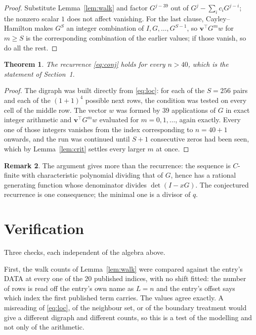 \documentclass[11pt,a4paper]{article}
\theoremstyle{plain}
\newtheorem{theorem}{Theorem}
\theoremstyle{definition}
\newtheorem{remark}[theorem]{Remark}
\begin{document}
\begin{proof}
Substitute Lemma~\ref{lem:walk} and factor $G^{j-39}$ out of
$G^{j}-\sum_ic_iG^{j-i}$; the nonzero scalar $1$ does not affect
vanishing. For the last clause, Cayley--Hamilton makes $G^{S}$ an integer combination of
$I,G,\dots,G^{S-1}$, so $\mathbf{v}^{\!\top}G^{m}w$ for $m\ge S$ is the corresponding
combination of the earlier values; if those vanish, so do all the rest.
\end{proof}

\begin{theorem}
The recurrence \eqref{eq:conj} holds for every $n>40$, which is the statement of
Section~1.
\end{theorem}

\begin{proof}
The digraph was built directly from \eqref{eq:loc}: for each of the $S=256$ pairs and each
of the $(1+1)^{4}$ possible next rows, the condition was tested on every cell of
the middle row. The vector $w$ was formed by $39$ applications of $G$ in exact integer
arithmetic and $\mathbf{v}^{\!\top}G^{m}w$ evaluated for $m=0,1,\dots$, again exactly.
Every one of those integers vanishes from the index corresponding to $n=40+1$ onwards,
and the run was continued until $S+1$ consecutive zeros had been seen, which by
Lemma~\ref{lem:crit} settles every larger $m$ at once.
\end{proof}

\begin{remark}
The argument gives more than the recurrence: the sequence is $C$-finite with characteristic
polynomial dividing that of $G$, hence has a rational generating function whose denominator
divides $\det(I-xG)$. The conjectured recurrence is one consequence; the minimal one is a
divisor of $q$.
\end{remark}

\section{Verification}

Three checks, each independent of the algebra above.

First, the walk counts of Lemma~\ref{lem:walk} were compared against the entry's DATA at
every one of the $20$ published indices, with no shift fitted: the number of rows is
read off the entry's own name as $L=n$ and the entry's offset says which index the first
published term carries. The values agree exactly. A misreading of \eqref{eq:loc}, of the
neighbour set, or of the boundary treatment would give a different digraph and different
counts, so this is a test of the modelling and not only of the arithmetic.
\end{document}
